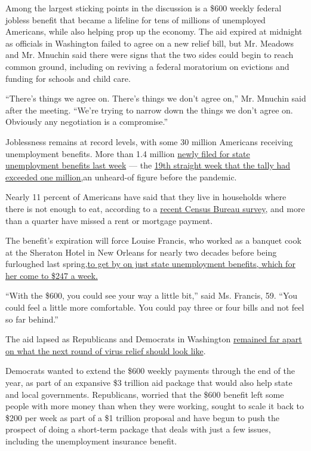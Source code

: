 Among the largest sticking points in the discussion is a \$600 weekly
federal jobless benefit that became a lifeline for tens of millions of
unemployed Americans, while also helping prop up the economy. The aid
expired at midnight as officials in Washington failed to agree on a new
relief bill, but Mr. Meadows and Mr. Mnuchin said there were signs that
the two sides could begin to reach common ground, including on reviving
a federal moratorium on evictions and funding for schools and child
care.

``There's things we agree on. There's things we don't agree on,'' Mr.
Mnuchin said after the meeting. ``We're trying to narrow down the things
we don't agree on. Obviously any negotiation is a compromise.''

Joblessness remains at record levels, with some 30 million Americans
receiving unemployment benefits. More than 1.4 million
\href{https://oui.doleta.gov/press/2020/073020.pdf}{newly filed for
state unemployment benefits last week} --- the
\href{https://www.nytimes.com/2020/07/30/business/economy/q2-gdp-coronavirus-economy.html}{19th
straight week that the tally had exceeded one million,}an unheard-of
figure before the pandemic.

Nearly 11 percent of Americans have said that they live in households
where there is not enough to eat, according to a
\href{https://www.census.gov/programs-surveys/household-pulse-survey/data.html?utm_campaign=20200727mspuls1ccdtanl\&utm_medium=email\&utm_source=govdelivery}{recent
Census Bureau survey}, and more than a quarter have missed a rent or
mortgage payment.

The benefit's expiration will force Louise Francis, who worked as a
banquet cook at the Sheraton Hotel in New Orleans for nearly two decades
before being furloughed last
spring,\href{https://www.nytimes.com/2020/07/30/business/economy/q2-gdp-coronavirus-economy.html}{to
get by on just state unemployment benefits, which for her come to \$247
a week.}

``With the \$600, you could see your way a little bit,'' said Ms.
Francis, 59. ``You could feel a little more comfortable. You could pay
three or four bills and not feel so far behind.''

The aid lapsed as Republicans and Democrats in Washington
\href{https://www.nytimes.com/2020/07/28/us/politics/coronavirus-relief-bills-house-senate.html}{remained
far apart on what the next round of virus relief should look like}.

Democrats wanted to extend the \$600 weekly payments through the end of
the year, as part of an expansive \$3 trillion aid package that would
also help state and local governments. Republicans, worried that the
\$600 benefit left some people with more money than when they were
working, sought to scale it back to \$200 per week as part of a \$1
trillion proposal and have begun to push the prospect of doing a
short-term package that deals with just a few issues, including the
unemployment insurance benefit.

